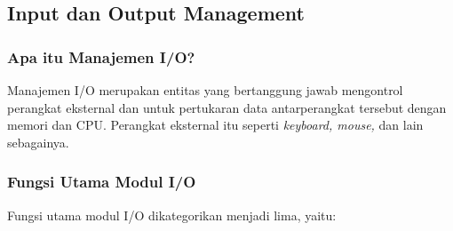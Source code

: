 \documentclass[12pt]{article}
\begin{document}
\subsection{Input dan Output Management} \subsubsection{Apa itu Manajemen I/O?} Manajemen I/O merupakan entitas yang bertanggung jawab mengontrol perangkat eksternal dan untuk pertukaran data antarperangkat tersebut dengan memori dan CPU. Perangkat eksternal itu seperti \textit{keyboard, mouse,} dan lain sebagainya.

\subsubsection{Fungsi Utama Modul I/O} 
Fungsi utama modul I/O dikategorikan menjadi lima, yaitu: 
\end{document}
